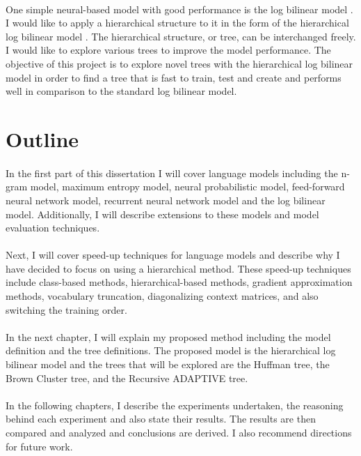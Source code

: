 \paragraph{}
One simple neural-based model with good performance is the log bilinear model \cite{MnihHinton2007}. I would like to apply a hierarchical structure to it in the form of the hierarchical log bilinear model \cite{MnihHinton2009}. The hierarchical structure, or tree, can be interchanged freely. I would like to explore various trees to improve the model performance. The objective of this project is to explore novel trees with the hierarchical log bilinear model in order to find a tree that is fast to train, test and create and performs well in comparison to the standard log bilinear model.

\section{Outline}
\paragraph{}
In the first part of this dissertation I will cover language models including the n-gram model, maximum entropy model, neural probabilistic model, feed-forward neural network model, recurrent neural network model and the log bilinear model. Additionally, I will describe extensions to these models and model evaluation techniques.

\paragraph{}
Next, I will cover speed-up techniques for language models and describe why I have decided to focus on using a hierarchical method. These speed-up techniques include class-based methods, hierarchical-based methods, gradient approximation methods, vocabulary truncation, diagonalizing context matrices, and also switching the training order.

\paragraph{}
In the next chapter, I will explain my proposed method including the model definition and the tree definitions. The proposed model is the hierarchical log bilinear model and the trees that will be explored are the Huffman tree, the Brown Cluster tree, and the Recursive ADAPTIVE tree.

\paragraph{}
In the following chapters, I describe the experiments undertaken, the reasoning behind each experiment and also state their results. The results are then compared and analyzed and conclusions are derived. I also recommend directions for future work.

